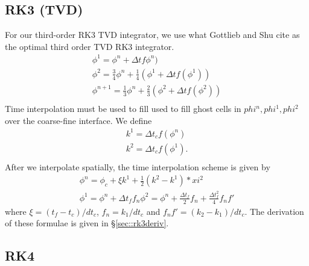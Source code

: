 \documentclass{article}
\newcommand{\dt}{{\Delta t}}
\begin{document}
\subsection{RK3 (TVD)}

For our third-order RK3 TVD  integrator, we  use what Gottlieb and Shu
\cite{gottlieb_shu} cite as the optimal third order TVD RK3
integrator.
$$
\begin{array}{l}
\phi^1 = \phi^n + \dt f\phi^n) \\
\phi^2    = \frac{3}{4} \phi^n +  \frac{1}{4}(\phi^1 + \dt f(\phi^1))\\
\phi^{n+1} = \frac{1}{3} \phi^n +  \frac{2}{3}(\phi^2 + \dt f(\phi^2))\\
\end{array}
$$
Time interpolation must be used to fill used to fill ghost cells in
$phi^n, phi^1, phi^2$ over the coarse-fine interface.  We define
$$
\begin{array}{l}
k^1 =  \dt_c f(\phi^n)\\
k^2 =  \dt_c f(\phi^1).\\
\end{array}
$$
After we interpolate spatially, the time interpolation scheme is given
by 
$$
\begin{array}{l}
\phi^n = \phi_c + \xi k^1 + \frac{1}{2}(k^2 - k^1)*xi^2 \\
\phi^1 = \phi^n + \dt_f f_n
\phi^2 = \phi^n + \frac{\dt_f}{2} f_n + \frac{\dt_f^2}{4}f_nf'
\end{array}
$$
where $\xi = (t_f- t_c)/dt_c$, $f_n = k_1/dt_c$ and $f_nf' =
(k_2-k_1)/dt_c$.  
The derivation of these formulae is given in \S \ref{sec::rk3deriv}.

\subsection{RK4}
\end{document}
